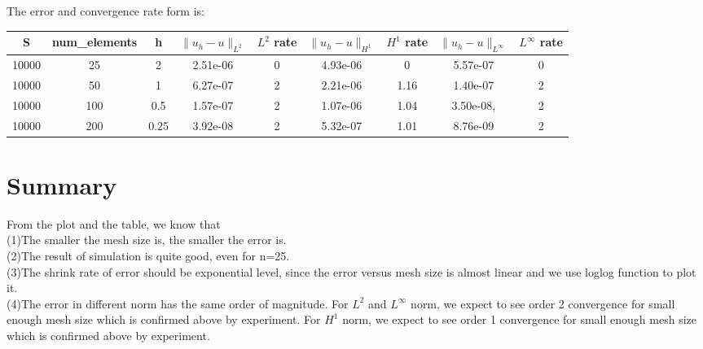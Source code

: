 \documentclass[11pt]{article}
\begin{document}
\begin{table}
	The error and convergence rate form is:\\
	\begin{center}
		\begin{tabular}{|c|c|c|c|c|c|c|c|c|} 
			\hline
			S & num\_elements  & h & $\|u_h-u\|_{L^{2}}$ & $L^{2}$ rate & $\|u_h-u\|_{H^{1}}$ & $H^{1}$ rate & $\|u_h-u\|_{L^{\infty}}$ & $L^{\infty}$ rate  \\ \hline
			10000 &  25   &   2  &  2.51e-06   &  0     &   4.93e-06 & 0 & 5.57e-07 & 0 \\
			10000 &  50   &   1 &  6.27e-07   &  2     &   2.21e-06 & 1.16 & 1.40e-07 & 2 \\
			10000 &  100   &   0.5  &  1.57e-07   &  2     &   1.07e-06 & 1.04 & 3.50e-08, & 2 \\
			10000 & 200   &   0.25  &  3.92e-08	   &  2     &   5.32e-07 & 1.01 & 8.76e-09 & 2 \\
			\hline
		\end{tabular}
	\end{center}
\end{table}


\section{Summary}
From the plot and the table, we know that\\
(1)The smaller the mesh size is, the smaller the error is.\\
(2)The result of simulation is quite good, even for n=25.\\
(3)The shrink rate of error should be exponential level, since the error versus mesh size is almost linear and we use loglog function to plot it.\\
(4)The error in different norm has the same order of magnitude. For $L^{2}$ and $L^{\infty}$ norm, we expect to see order 2 convergence for small enough mesh size which is confirmed above by experiment. For $H^{1}$ norm, we expect to see order 1 convergence for small enough mesh size which is confirmed above by experiment.
\end{document}
